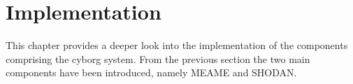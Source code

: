 \chapter{Implementation}
This chapter provides a deeper look into the implementation of the components
comprising the cyborg system. 
From the previous section the two main components have been introduced, namely
MEAME and SHODAN. 
